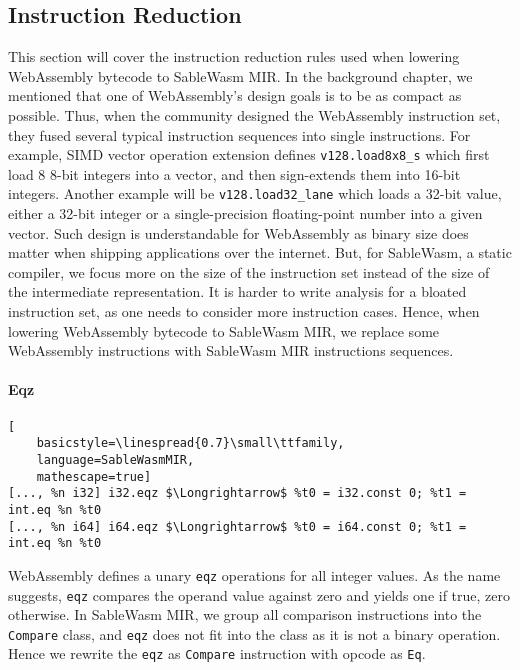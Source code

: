 \subsection{Instruction Reduction}

This section will cover the instruction reduction rules used when lowering
WebAssembly bytecode to SableWasm MIR. In the background chapter, we mentioned
that one of WebAssembly's design goals is to be as compact as possible. Thus,
when the community designed the WebAssembly instruction set, they fused several
typical instruction sequences into single instructions. For example, SIMD vector
operation extension defines \texttt{v128.load8x8\_s} which first load 8
8-bit integers into a vector, and then sign-extends them into 16-bit
integers. Another example will be \texttt{v128.load32\_lane} which loads a
32-bit value, either a 32-bit integer or a single-precision floating-point
number into a given vector. Such design is understandable for WebAssembly as
binary size does matter when shipping applications over the internet. But, for
SableWasm, a static compiler, we focus more on the size of the instruction set
instead of the size of the intermediate representation. It is harder to write
analysis for a bloated instruction set, as one needs to consider more
instruction cases. Hence, when lowering WebAssembly bytecode to SableWasm MIR,
we replace some WebAssembly instructions with SableWasm MIR instructions
sequences.

\paragraph{Eqz} \quad
\begin{lstlisting}[
    basicstyle=\linespread{0.7}\small\ttfamily, 
    language=SableWasmMIR, 
    mathescape=true]
[..., %n i32] i32.eqz $\Longrightarrow$ %t0 = i32.const 0; %t1 = int.eq %n %t0
[..., %n i64] i64.eqz $\Longrightarrow$ %t0 = i64.const 0; %t1 = int.eq %n %t0
\end{lstlisting}
WebAssembly defines a unary \texttt{eqz} operations for all integer values. As
the name suggests, \texttt{eqz} compares the operand value against zero and
yields one if true, zero otherwise. In SableWasm MIR, we group all comparison
instructions into the \texttt{Compare} class, and \texttt{eqz} does not fit into
the class as it is not a binary operation. Hence we rewrite the \texttt{eqz} as
\texttt{Compare} instruction with opcode as \texttt{Eq}.

